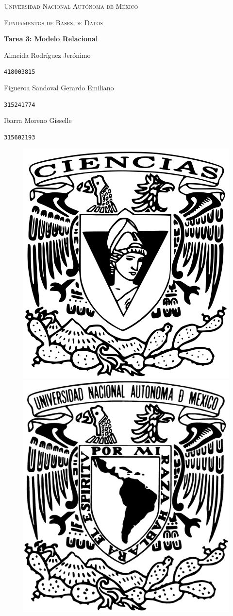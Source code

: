\documentclass[a4paper, 12pt]{report}
\begin{document}
\begin{titlepage}
    \centering
    {\scshape\Huge Universidad Nacional Autónoma de México \par}
    \vspace{1.25cm}
    {\scshape\huge Fundamentos de Bases de Datos\par}
    \vspace{1.25cm}
    {\huge\bfseries Tarea 3: Modelo Relacional\par}
    \vspace{1.25cm}
    {\Large\textsc Almeida Rodríguez Jerónimo\par}
    \vspace{.1cm}
    {\large\texttt{418003815}\par}
    \vspace{0.25cm}
    {\Large\textsc Figueroa Sandoval Gerardo Emiliano\par}
    \vspace{.1cm}
    {\large\texttt{315241774}\par}
    \vspace{0.25cm}
    {\Large\textsc Ibarra Moreno Gisselle \par}
    \vspace{.1cm}
    {\large\texttt{315602193}\par}
    \vspace{1.5cm}
    \vfill
    \begin{figure}[hb!]
        \includegraphics[width=.3\textwidth]
            {../logos/escudo_f-ciencias.png}\hfill
        \includegraphics[width=.3\textwidth]
            {../logos/Escudo_UNAM.png}\hfill
    \end{figure}
\end{titlepage}
\end{document}
